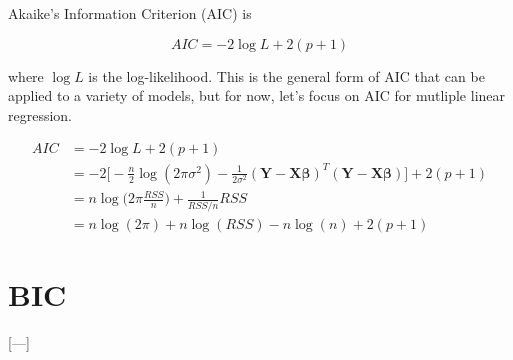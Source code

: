 \documentclass[]{book}
\begin{document}
Akaike's Information Criterion (AIC) is

\begin{equation}
\label{aic}
AIC = -2 \log L + 2(p+1)
\end{equation}

where \(\log L\) is the log-likelihood. This is the general form of AIC
that can be applied to a variety of models, but for now, let's focus on
AIC for mutliple linear regression.

\begin{equation}
\label{aic-reg}
\begin{aligned}
AIC &= -2 \log L + 2(p+1) \\[10pt]
&= -2\bigg[-\frac{n}{2}\log(2\pi\sigma^2) - \frac{1}{2\sigma^2}(\mathbf{Y} - \mathbf{X} \boldsymbol{\beta})^T(\mathbf{Y} - \mathbf{X} \boldsymbol{\beta})\bigg] + 2(p+1) \\[10pt]
&= n\log\big(2\pi\frac{RSS}{n}\big) + \frac{1}{RSS/n}RSS \\[10pt]
&= n\log(2\pi) + n\log(RSS) - n\log(n) + 2(p+1)
\end{aligned}
\end{equation}

\section{BIC}\label{bic}

{[}---{]}


\end{document}
